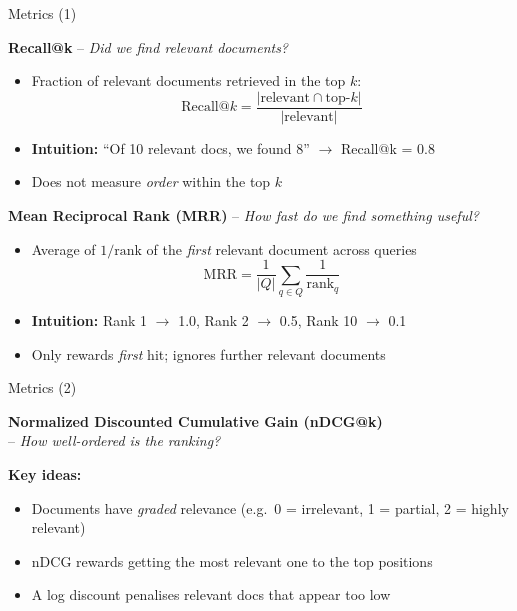 \documentclass[11pt,compress,t,notes=noshow, xcolor=table]{beamer}
\begin{document}
\begin{frame}{Metrics (1)}

\vfill

\textbf{Recall@k} -- \textit{Did we find relevant documents?}
\begin{itemize}
    \item Fraction of relevant documents retrieved in the top $k$:
    {\small $$\text{Recall@}k = \frac{|\text{relevant} \cap \text{top-}k|}{|\text{relevant}|}$$}
    \item \textbf{Intuition:} ``Of 10 relevant docs, we found 8'' $\rightarrow$ Recall@k = 0.8
    \item \warning Does not measure \textit{order} within the top $k$
\end{itemize}

\vspace{1em}

\textbf{Mean Reciprocal Rank (MRR)} -- \textit{How fast do we find something useful?}
\begin{itemize}
    \item Average of $1/\text{rank}$ of the \textit{first} relevant document across queries
    {\small $$\text{MRR} = \frac{1}{|Q|}\sum_{q \in Q} \frac{1}{\text{rank}_q}$$}
    \item \textbf{Intuition:} Rank 1 $\rightarrow$ 1.0,\; Rank 2 $\rightarrow$ 0.5,\; Rank 10 $\rightarrow$ 0.1
    \item \warning Only rewards \textit{first} hit; ignores further relevant documents
\end{itemize}

\vfill

\end{frame}


\begin{frame}{Metrics (2)}

\vfill

\textbf{Normalized Discounted Cumulative Gain (nDCG@k)}\\ -- \textit{How well-ordered is the ranking?}

\vspace{0.5em}

\textbf{Key ideas:}
\begin{itemize}
    \item Documents have \textit{graded} relevance (e.g.\ 0 = irrelevant, 1 = partial, 2 = highly relevant)
    \item nDCG rewards getting the most relevant one to the top positions
    \item A log discount penalises relevant docs that appear too low
\end{itemize}

\vfill

\end{frame}
\end{document}
